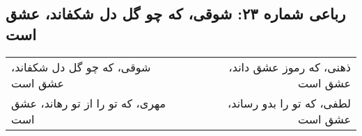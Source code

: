 \begin{center}
\section*{رباعی شماره ۲۳: شوقی، که چو گل دل شکفاند، عشق است}
\label{sec:023}
\begin{longtable}{l p{0.5cm} r}
شوقی، که چو گل دل شکفاند، عشق است
&&
ذهنی، که رموز عشق داند، عشق است
\\
مهری، که تو را از تو رهاند، عشق است
&&
لطفی، که تو را بدو رساند، عشق است
\\
\end{longtable}
\end{center}
